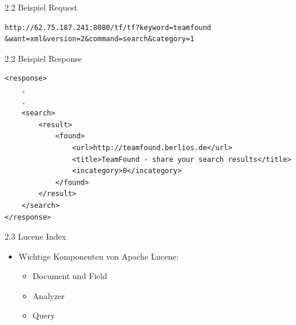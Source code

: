 \documentclass[landscape]{slides}
\begin{document}
%
\begin{slide}{2.2 Beispiel Request}\\
\begin{verbatim}
http://62.75.187.241:8080/tf/tf?keyword=teamfound
&want=xml&version=2&command=search&category=1
\end{verbatim}
\end{slide}
\begin{slide}{2.2 Beispiel Response }\\
\begin{verbatim}
<response>
	.
	.
	<search>	
		<result>
			<found>
				<url>http://teamfound.berlios.de</url>
				<title>TeamFound - share your search results</title>
				<incategory>0</incategory>
			</found>
		</result>
	</search>
</response>
\end{verbatim}
\end{slide}
%
\begin{slide}{2.3 Lucene Index}\\
\begin{itemize}
\item Wichtige Komponenten von Apache Lucene:
\begin{itemize}
\item Document und Field
\item Analyzer
\item Query
\end{itemize}
\end{itemize}
\end{slide}
\end{document}
